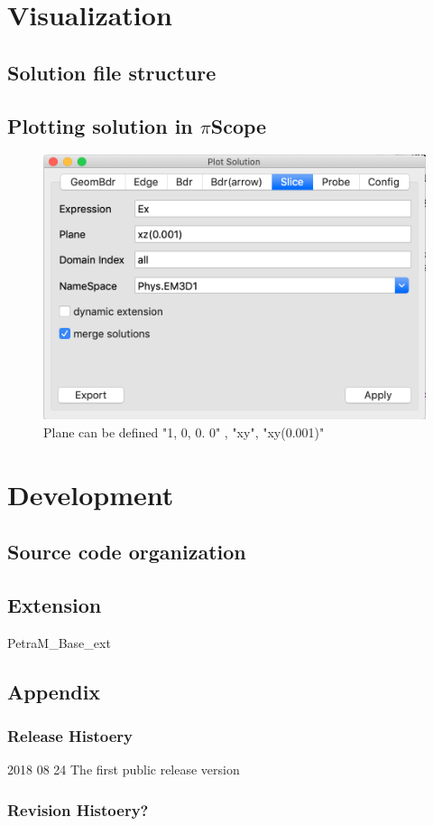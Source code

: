 \documentclass[11pt,a4paper,final]{report}
\begin{document}
\chapter{Visualization}
\section{Solution file structure}
\section{Plotting solution in $\pi$Scope}

\begin{figure}
\centering
\includegraphics[width=0.95\columnwidth]{figures/slice_plot.png} 
\caption{ Plane can be defined "1, 0, 0. 0" , "xy", "xy(0.001)" }\label{parametric_scan}
\end{figure}


\chapter{Development}
\section{Source code organization}
\section{Extension}
PetraM\_Base\_ext

\section{Appendix}
\subsection{Release Histoery}

2018 08 24  The first public release version

\subsection{Revision Histoery?}
\end{document}
